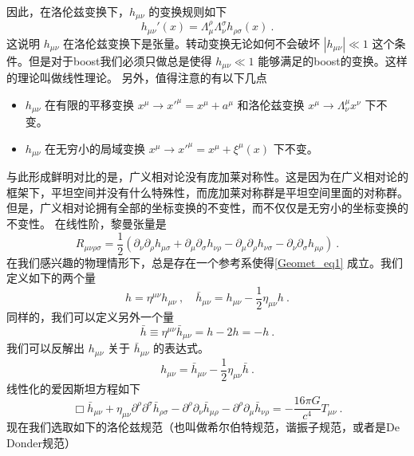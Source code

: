 因此，在洛伦兹变换下，$h_{\mu\nu}$ 的变换规则如下
\begin{equation}
h_{\mu\nu}'(x) = \Lambda^\rho_\mu\Lambda^\sigma_\nu h_{\rho\sigma} (x) ~. 
\end{equation}
这说明 $h_{\mu\nu}$ 在洛伦兹变换下是张量。转动变换无论如何不会破坏 $|h_{\mu\nu}|\ll 1$ 这个条件。但是对于boost我们必须只做总是使得 $h_{\mu\nu}\ll 1$ 能够满足的boost的变换。这样的理论叫做线性理论。
另外，值得注意的有以下几点
\begin{itemize}
\item $h_{\mu\nu}$ 在有限的平移变换 $x^\mu\rightarrow x'^\mu = x^\mu + a^\mu$ 和洛伦兹变换 $x^\mu\rightarrow \Lambda^\mu_\nu x^\nu$ 下不变。
\item $h_{\mu\nu}$ 在无穷小的局域变换 $x^\mu \rightarrow x'^\mu = x^\mu + \xi^\mu (x)$ 下不变。
\end{itemize}
与此形成鲜明对比的是，广义相对论没有庞加莱对称性。这是因为在广义相对论的框架下，平坦空间并没有什么特殊性，而庞加莱对称群是平坦空间里面的对称群。但是，广义相对论拥有全部的坐标变换的不变性，而不仅仅是无穷小的坐标变换的不变性。
在线性阶，黎曼张量是
\begin{equation}
R_{\mu\nu\rho\sigma} = \frac{1}{2}  (\partial_\nu\partial_\rho h_{\mu\sigma} + \partial_\mu\partial_\sigma h_{\nu\rho} - \partial_\mu\partial_\rho h_{\nu\sigma} - \partial_\nu\partial_\sigma h_{\mu\rho}  ) ~.
\end{equation} 
在我们感兴趣的物理情形下，总是存在一个参考系使得\autoref{Geomet_eq1} 成立。我们定义如下的两个量 
\begin{equation}
h = \eta^{\mu\nu} h_{\mu\nu} ~, \quad \bar h_{\mu\nu} = h_{\mu\nu} - \frac{1}{2} \eta_{\mu\nu} h~.
\end{equation}
同样的，我们可以定义另外一个量
\begin{equation}
\bar h \equiv \eta^{\mu\nu} \bar h_{\mu\nu} = h - 2 h = -h~.
\end{equation}
我们可以反解出 $h_{\mu\nu}$ 关于 $\bar h_{\mu\nu}$ 的表达式。
\begin{equation}
h_{\mu\nu} = \bar h_{\mu\nu} - \frac{1}{2} \eta_{\mu\nu} \bar h ~. 
\end{equation}
线性化的爱因斯坦方程如下
\begin{equation}\label{Geomet_eq2}
\Box \bar h_{\mu\nu} + \eta_{\mu\nu} \partial^\rho \partial^\sigma \bar h_{\rho\sigma} - \partial^\rho \partial_\nu \bar h_{\mu\rho} - \partial^\rho\partial_\mu \bar h_{\nu\rho} = - \frac{16\pi G}{c^4} T_{\mu\nu} ~. 
\end{equation}
现在我们选取如下的洛伦兹规范（也叫做希尔伯特规范，谐振子规范，或者是De Donder规范）
